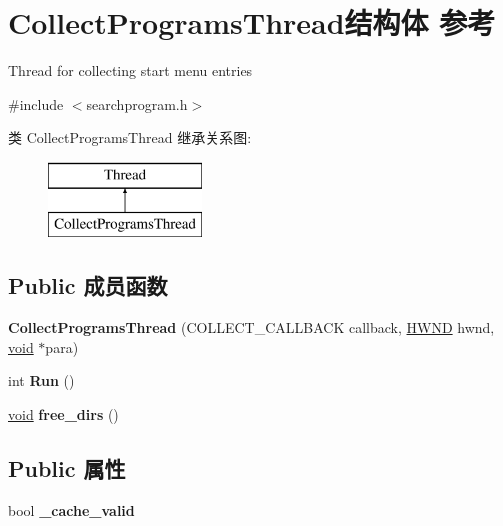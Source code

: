 \hypertarget{struct_collect_programs_thread}{}\section{Collect\+Programs\+Thread结构体 参考}
\label{struct_collect_programs_thread}


Thread for collecting start menu entries  




{\ttfamily \#include $<$searchprogram.\+h$>$}

类 Collect\+Programs\+Thread 继承关系图\+:\begin{figure}[H]
\begin{center}
\leavevmode
\includegraphics[height=2.000000cm]{struct_collect_programs_thread}
\end{center}
\end{figure}
\subsection*{Public 成员函数}
\begin{DoxyCompactItemize}
\item 
\mbox{\label{struct_collect_programs_thread_a52c53d71738b908fa7e4c57d092e499e}} 
{\bfseries Collect\+Programs\+Thread} (C\+O\+L\+L\+E\+C\+T\+\_\+\+C\+A\+L\+L\+B\+A\+CK callback, \hyperlink{interfacevoid}{H\+W\+ND} hwnd, \hyperlink{interfacevoid}{void} $\ast$para)
\item 
\mbox{\label{struct_collect_programs_thread_a7c156a7d3232ded03e19e7f07ff81989}} 
int {\bfseries Run} ()
\item 
\mbox{\label{struct_collect_programs_thread_a07df0e9209171e9d554d137a1b5e330b}} 
\hyperlink{interfacevoid}{void} {\bfseries free\+\_\+dirs} ()
\end{DoxyCompactItemize}
\subsection*{Public 属性}
\begin{DoxyCompactItemize}
\item 
\mbox{\label{struct_collect_programs_thread_a13cca64a894d3b8f53be3075a00af28f}} 
bool {\bfseries \+\_\+cache\+\_\+valid}
\end{DoxyCompactItemize}
